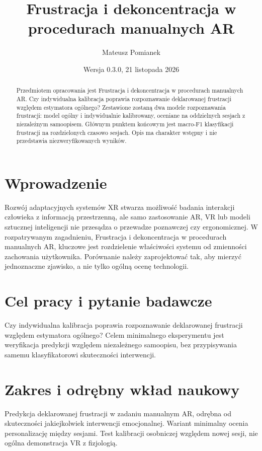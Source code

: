 \documentclass[11pt,a4paper]{article}
\title{Frustracja i dekoncentracja w procedurach manualnych AR}
\author{Mateusz Pomianek}
\date{Wersja 0.3.0, 21 listopada 2026}
\begin{document}
\maketitle

\begin{abstract}

Przedmiotem opracowania jest Frustracja i dekoncentracja w procedurach manualnych AR. Czy indywidualna kalibracja poprawia rozpoznawanie deklarowanej frustracji względem estymatora ogólnego? Zestawione zostaną dwa modele rozpoznawania frustracji: model ogólny i indywidualnie kalibrowany, oceniane na oddzielnych sesjach z niezależnym samoopisem. Głównym punktem końcowym jest macro-F1 klasyfikacji frustracji na rozdzielonych czasowo sesjach. Opis ma charakter wstępny i nie przedstawia niezweryfikowanych wyników.

\end{abstract}

\section{Wprowadzenie}

Rozwój adaptacyjnych systemów XR stwarza możliwość badania interakcji człowieka z informacją przestrzenną, ale samo zastosowanie AR, VR lub modeli sztucznej inteligencji nie przesądza o przewadze poznawczej czy ergonomicznej. W rozpatrywanym zagadnieniu, Frustracja i dekoncentracja w procedurach manualnych AR, kluczowe jest rozdzielenie właściwości systemu od zmienności zachowania użytkownika. Porównanie należy zaprojektować tak, aby mierzyć jednoznaczne zjawisko, a nie tylko ogólną ocenę technologii.

\section{Cel pracy i pytanie badawcze}

Czy indywidualna kalibracja poprawia rozpoznawanie deklarowanej frustracji względem estymatora ogólnego? Celem minimalnego eksperymentu jest weryfikacja predykcji względem niezależnego samoopisu, bez przypisywania samemu klasyfikatorowi skuteczności interwencji.

\section{Zakres i odrębny wkład naukowy}
Predykcja deklarowanej frustracji w zadaniu manualnym AR, odrębna od skuteczności jakiejkolwiek interwencji emocjonalnej. Wariant minimalny ocenia personalizację między sesjami. Test kalibracji osobniczej względem nowej sesji, nie ogólna demonstracja VR z fizjologią.
\end{document}
